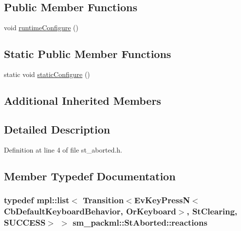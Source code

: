 \subsection*{Public Member Functions}
\begin{DoxyCompactItemize}
\item 
void \hyperlink{structsm__packml_1_1StAborted_ae24353777c69ff47bf657ba4314fb0c3}{runtime\+Configure} ()
\end{DoxyCompactItemize}
\subsection*{Static Public Member Functions}
\begin{DoxyCompactItemize}
\item 
static void \hyperlink{structsm__packml_1_1StAborted_a73f83ae5cecaba62aa744b947d2598b3}{static\+Configure} ()
\end{DoxyCompactItemize}
\subsection*{Additional Inherited Members}


\subsection{Detailed Description}


Definition at line 4 of file st\+\_\+aborted.\+h.



\subsection{Member Typedef Documentation}
\subsubsection[{\texorpdfstring{reactions}{reactions}}]{\setlength{\rightskip}{0pt plus 5cm}typedef mpl\+::list$<$ Transition$<$Ev\+Key\+PressN$<$Cb\+Default\+Keyboard\+Behavior, {\bf Or\+Keyboard}$>$, {\bf St\+Clearing}, {\bf S\+U\+C\+C\+E\+SS}$>$ $>$ {\bf sm\+\_\+packml\+::\+St\+Aborted\+::reactions}}\hypertarget{structsm__packml_1_1StAborted_a0ada6056ec0c5c45cd03c1c4bf720501}{}\label{structsm__packml_1_1StAborted_a0ada6056ec0c5c45cd03c1c4bf720501}


